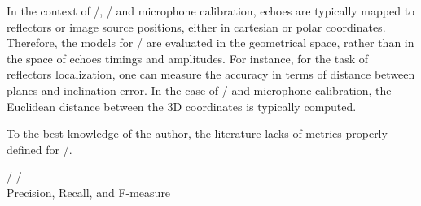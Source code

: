 \mynewline
In the context of \RooGE/, \SSL/ and microphone calibration, echoes are typically mapped to reflectors or image source positions, either in cartesian or polar coordinates.
Therefore, the models for \AER/ are evaluated in the geometrical space, rather than in the space of echoes timings and amplitudes.
For instance, for the task of reflectors localization, one can measure the accuracy in terms of distance between planes and inclination error.
In the case of \SSL/ and microphone calibration, the Euclidean distance between the 3D coordinates is typically computed.

\mynewline
To the best knowledge of the author, the literature lacks of metrics properly defined for \AER/.
\begin{description}
    \item[\TOAs/ \RMSEtxt/]
    \item[Precision, Recall, and F-measure]
\end{description}